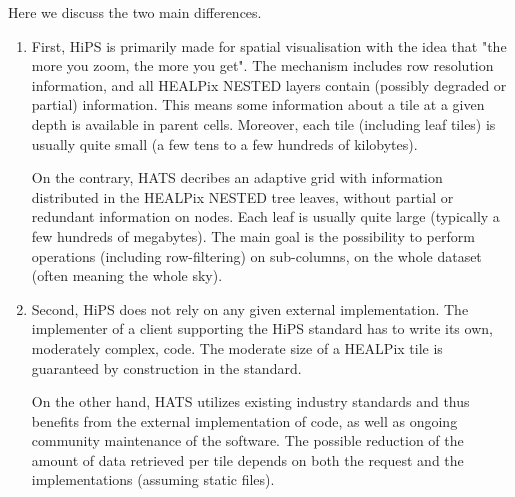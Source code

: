 \documentclass[11pt,a4paper]{ivoa}
\begin{document}
Here we discuss the two main differences.
\begin{enumerate}
  \item First, HiPS is primarily made for spatial visualisation with the idea that "the more you zoom, the more you get".
The mechanism includes row resolution information, and all HEALPix NESTED layers contain (possibly degraded or partial) information. 
This means some information about a tile at a given depth is available in parent cells.
Moreover, each tile (including leaf tiles) is usually quite small (a few tens to a few hundreds of kilobytes). \par 
On the contrary, HATS decribes an adaptive grid with information distributed in the HEALPix NESTED tree leaves, without partial or redundant information on nodes.
Each leaf is usually quite large (typically a few hundreds of megabytes). 
The main goal is the possibility to perform operations (including row-filtering) on sub-columns, on the whole dataset (often meaning the whole sky).
   \item Second, HiPS does not rely on any given external implementation.
The implementer of a client supporting the HiPS standard has to write its own, moderately complex, code.
The moderate size of a HEALPix tile is guaranteed by construction in the standard. \par
On the other hand, HATS utilizes existing industry standards and thus benefits from the external implementation of code, as well as ongoing community maintenance of the software.
The possible reduction of the amount of data retrieved per tile depends on both the request and the implementations (assuming static files).
\end{enumerate}
\end{document}

